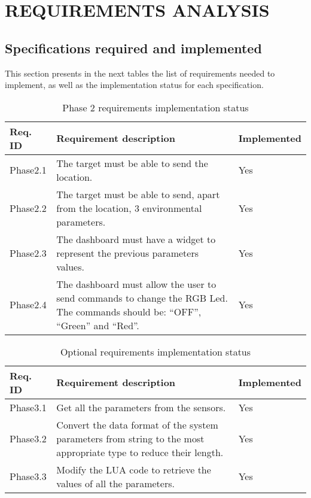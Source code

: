 \section{REQUIREMENTS ANALYSIS}
\subsection{Specifications required and implemented}

This section presents in the next tables the list of requirements needed to implement, as well as the implementation status for each specification.
\vspace{2\baselineskip}
\begin{table}[H]
    \begin{center}
        \begin{tabular}{|p{} | p{} | p{}|}
            \hline
            \textbf{Req. ID} & \textbf{Requirement description} & \textbf{Implemented}\\
            \hline
            Phase2.1 & The target must be able to send the location. & Yes\\
            \hline
            Phase2.2 & The target must be able to send, apart from the location, 3 environmental parameters. & Yes\\
            \hline
            Phase2.3 & The dashboard must have a widget to represent the previous parameters values. & Yes\\
            \hline
            Phase2.4 & The dashboard must allow the user to send commands to change the RGB Led. The commands should be: ``OFF'', ``Green'' and ``Red''.  & Yes\\
            \hline
        \end{tabular} 
    \end{center}
    \caption{Phase 2 requirements implementation status}
    \label{ReqGeneral}
\end{table}

\vspace{2\baselineskip}

\begin{table}[H]
    \begin{center}
        \begin{tabular}{|p{} | p{} | p{}|}
            \hline
            \textbf{Req. ID} & \textbf{Requirement description} & \textbf{Implemented}\\
            \hline
            Phase3.1 & Get all the parameters from the sensors. & Yes\\
            \hline
            Phase3.2 & Convert the data format of the system parameters from string to the most appropriate type to reduce their length. & Yes\\
            \hline
            Phase3.3 & Modify the LUA code to retrieve the values of all the parameters. & Yes\\
            \hline
        \end{tabular} 
    \end{center}
    \caption{Optional requirements implementation status}
    \label{ReqTest}
\end{table}

